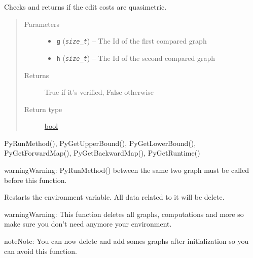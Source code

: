\documentclass[letterpaper,10pt,english]{sphinxmanual}
\begin{document}

\begin{fulllineitems}
\label{doc:PythonGedLib.PyQuasimetricCost}
Checks and returns if the edit costs are quasimetric.
\begin{quote}\begin{description}
\item[{Parameters}] \leavevmode\begin{itemize}
\item {} 
\textbf{\texttt{g}} (\emph{\texttt{size\_t}}) -- The Id of the first compared graph

\item {} 
\textbf{\texttt{h}} (\emph{\texttt{size\_t}}) -- The Id of the second compared graph

\end{itemize}

\item[{Returns}] \leavevmode
True if it's verified, False otherwise

\item[{Return type}] \leavevmode
\href{https://docs.python.org/3/library/functions.html\#bool}{bool}

\end{description}\end{quote}




PyRunMethod(), PyGetUpperBound(), PyGetLowerBound(),  PyGetForwardMap(), PyGetBackwardMap(), PyGetRuntime()



\begin{notice}{warning}{Warning:}
PyRunMethod() between the same two graph must be called before this function.
\end{notice}

\end{fulllineitems}


\begin{fulllineitems}
\label{doc:PythonGedLib.PyRestartEnv}
Restarts the environment variable. All data related to it will be delete.

\begin{notice}{warning}{Warning:}
This function deletes all graphs, computations and more so make sure you don't need anymore your environment.
\end{notice}

\begin{notice}{note}{Note:}
You can now delete and add somes graphs after initialization so you can avoid this function.
\end{notice}

\end{fulllineitems}
\end{document}
